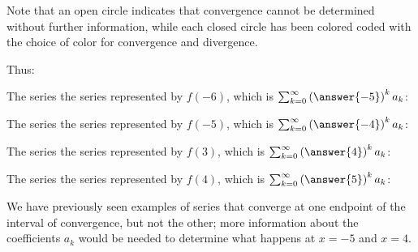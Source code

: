 \documentclass{ximera}
\begin{document}
\begin{exercise}
\begin{hint}
\begin{question}
Note that an open circle indicates that convergence cannot be determined without further information, while each closed circle has been colored coded with the choice of color for convergence and divergence.

Thus:

\begin{question}
The series the series represented by $f(-6)$, which is $\sum_{k=0}^{\infty} \left(\answer{-5}\right)^k a_k$:
\begin{multipleChoice}
\end{multipleChoice}
\end{question}

 \begin{question}
The series the series represented by $f(-5)$, which is $\sum_{k=0}^{\infty} \left(\answer{-4}\right)^k a_k$:
\begin{multipleChoice}
\end{multipleChoice}
\end{question}

\begin{question}
The series the series represented by $f(3)$, which is $\sum_{k=0}^{\infty} \left(\answer{4}\right)^k a_k$:
\begin{multipleChoice}
\end{multipleChoice}
\end{question}

\begin{question}
The series the series represented by $f(4)$, which is $\sum_{k=0}^{\infty} \left(\answer{5}\right)^k a_k$:
\begin{multipleChoice}
\end{multipleChoice}
\end{question}

We have previously seen examples of series that converge at one endpoint of the interval of convergence, but not the other; more information about the coefficients $a_k$ would be needed to determine what happens at $x=-5$ and $x=4$.
\end{question}
\end{hint}


\end{exercise}
\end{document}
